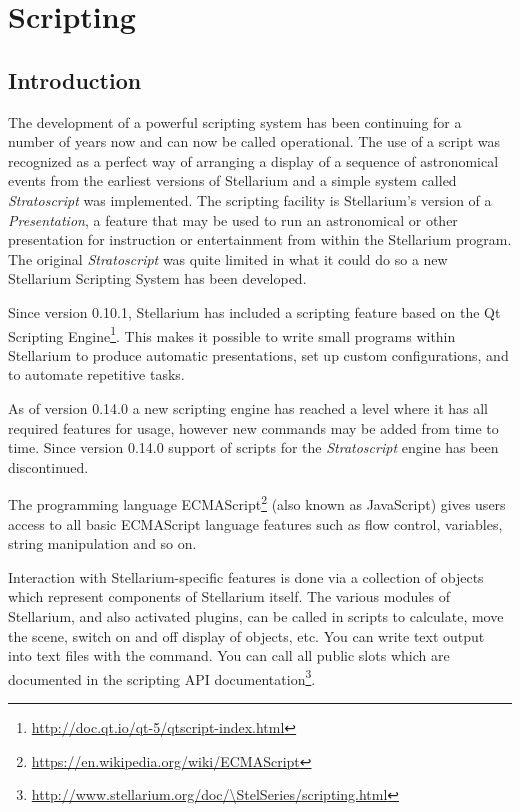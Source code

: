 
\chapter{Scripting}
\label{ch:scripting}


\section{Introduction}
\label{sec:scripting:introduction}


The development of a powerful scripting system has been continuing for
a number of years now and can now be called operational. The use of a
script was recognized as a perfect way of arranging a display of a
sequence of astronomical events from the earliest versions of
Stellarium and a simple system called \emph{Stratoscript} was
implemented. The scripting facility is Stellarium's version of a
\emph{Presentation}, a feature that may be used to run an astronomical
or other presentation for instruction or entertainment from within the
Stellarium program. The original \emph{Stratoscript} was quite limited in
what it could do so a new Stellarium Scripting System has been
developed.

Since version 0.10.1, Stellarium has included a scripting feature based on
the Qt Scripting
Engine\footnote{\url{http://doc.qt.io/qt-5/qtscript-index.html}}. This
makes it possible to write small programs within Stellarium to produce
automatic presentations, set up custom configurations, and to automate
repetitive tasks. 

As of version 0.14.0 a new scripting engine has reached a level where
it has all required features for usage, however new commands may be
added from time to time. Since version 0.14.0 support of scripts for
the \emph{Stratoscript} engine has been discontinued.

The programming language
ECMAScript\footnote{\url{https://en.wikipedia.org/wiki/ECMAScript}}
(also known as JavaScript) gives users access to all basic ECMAScript
language features such as flow control, variables, string manipulation
and so on.

Interaction with Stellarium-specific features is done via a collection
of objects which represent components of Stellarium itself.  The
various modules of Stellarium, and also activated plugins, can be
called in scripts to calculate, move the scene, switch on and off
display of objects, etc.  You can write text output into text files
with the  command.  You can call all public slots
which are documented in the scripting API documentation\footnote{
\url{http://www.stellarium.org/doc/\StelSeries/scripting.html}}.

